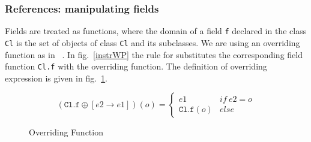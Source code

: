 \subsubsection{References: manipulating fields}
Fields are treated as functions, where the domain of a field \texttt{f} 
declared in the class \texttt{Cl} is the set of objects of class \texttt{Cl} and its subclasses.
We are using an overriding function as in ~\cite{B00ppp}. 
In fig.~\ref{instrWP} the rule for  substitutes the corresponding field function \texttt{Cl.f} with the overriding function. 
The definition of overriding expression is given in fig.~\ref{override}.

\begin{figure}
$$
 (\texttt{Cl.f} \oplus[e2 \rightarrow e1])(o) = \left\{ \begin{array} {ll}
						       e1 & if \ e2 = o \\
					               \texttt{Cl.f}(o)	& else 
	\end{array}\right. 
$$ 
\caption{Overriding Function}
\label{override}
\end{figure}



